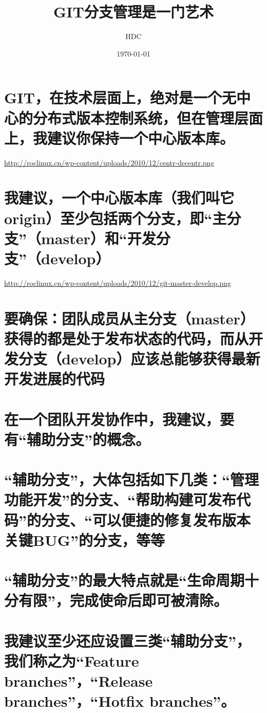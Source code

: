 \documentclass[11pt]{article}
\title{GIT分支管理是一门艺术}
\author{HDC}
\date{\today}
\begin{document}
\maketitle

\setcounter{tocdepth}{3}
\tableofcontents
\vspace*{1cm}


\section{GIT，在技术层面上，绝对是一个无中心的分布式版本控制系统，但在管理层面上，我建议你保持一个中心版本库。}
\label{sec-1}

\href{http://roclinux.cn/wp-content/uploads/2010/12/centr-decentr.png}{http://roclinux.cn/wp-content/uploads/2010/12/centr-decentr.png}
\section{我建议，一个中心版本库（我们叫它origin）至少包括两个分支，即“主分支”（master）和“开发分支”（develop）}
\label{sec-2}

\href{http://roclinux.cn/wp-content/uploads/2010/12/git-master-develop.png}{http://roclinux.cn/wp-content/uploads/2010/12/git-master-develop.png}
\section{要确保：团队成员从主分支（master）获得的都是处于发布状态的代码，而从开发分支（develop）应该总能够获得最新开发进展的代码}
\label{sec-3}
\section{在一个团队开发协作中，我建议，要有“辅助分支”的概念。}
\label{sec-4}
\section{“辅助分支”，大体包括如下几类：“管理功能开发”的分支、“帮助构建可发布代码”的分支、“可以便捷的修复发布版本关键BUG”的分支，等等}
\label{sec-5}
\section{“辅助分支”的最大特点就是“生命周期十分有限”，完成使命后即可被清除。}
\label{sec-6}
\section{我建议至少还应设置三类“辅助分支”，我们称之为“Feature branches”，“Release branches”，“Hotfix branches”。}
\label{sec-7}
\end{document}
